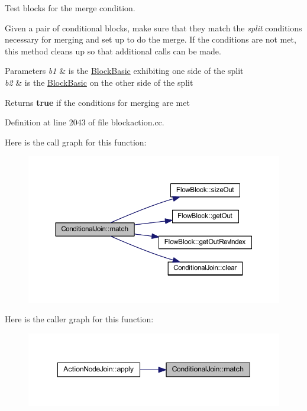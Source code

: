 Test blocks for the merge condition. 

Given a pair of conditional blocks, make sure that they match the {\itshape split} conditions necessary for merging and set up to do the merge. If the conditions are not met, this method cleans up so that additional calls can be made. 
\begin{DoxyParams}{Parameters}
{\em b1} & is the \mbox{\hyperlink{class_block_basic}{Block\+Basic}} exhibiting one side of the split \\
\hline
{\em b2} & is the \mbox{\hyperlink{class_block_basic}{Block\+Basic}} on the other side of the split \\
\hline
\end{DoxyParams}
\begin{DoxyReturn}{Returns}
{\bfseries{true}} if the conditions for merging are met 
\end{DoxyReturn}


Definition at line 2043 of file blockaction.\+cc.

Here is the call graph for this function\+:
\nopagebreak
\begin{figure}[H]
\begin{center}
\leavevmode
\includegraphics[width=350pt]{class_conditional_join_ab4f86556c6387f177e341329ed346e99_cgraph}
\end{center}
\end{figure}
Here is the caller graph for this function\+:
\nopagebreak
\begin{figure}[H]
\begin{center}
\leavevmode
\includegraphics[width=344pt]{class_conditional_join_ab4f86556c6387f177e341329ed346e99_icgraph}
\end{center}
\end{figure}



